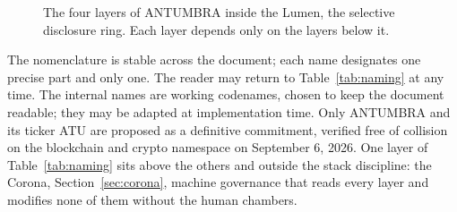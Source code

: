 \begin{figure}[htbp]
\centering
{}
\caption{The four layers of ANTUMBRA inside the Lumen, the selective
disclosure ring. Each layer depends only on the layers below it.}
\label{fig:arch}
\end{figure}

The nomenclature is stable across the document; each name designates one
precise part and only one. The reader may return to Table~\ref{tab:naming}
at any time. The internal names are working codenames, chosen to keep the
document readable; they may be adapted at implementation time. Only
ANTUMBRA and its ticker ATU are proposed as a definitive commitment,
verified free of collision on the blockchain and crypto namespace on
September 6, 2026. One layer of Table~\ref{tab:naming} sits above the
others and outside the stack discipline: the Corona,
Section~\ref{sec:corona}, machine governance that reads every layer and
modifies none of them without the human chambers.


